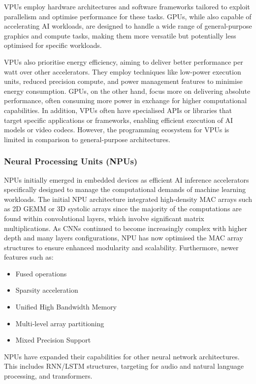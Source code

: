 VPUs employ hardware architectures and software frameworks tailored to exploit parallelism and optimise performance for these tasks. GPUs, while also capable of accelerating AI workloads, are designed to handle a wide range of general-purpose graphics and compute tasks, making them more versatile but potentially less optimised for specific workloads.

VPUs also prioritise energy efficiency, aiming to deliver better performance per watt over other accelerators. They employ techniques like low-power execution units, reduced precision compute, and power management features to minimise energy consumption. GPUs, on the other hand, focus more on delivering absolute performance, often consuming more power in exchange for higher computational capabilities. In addition, VPUs often have specialised APIs or libraries that target specific applications or frameworks, enabling efficient execution of AI models or video codecs. However, the programming ecosystem for VPUs is limited in comparison to general-purpose architectures.

\subsubsection{Neural Processing Units (NPUs)}
 NPUs initially emerged in embedded devices as efficient AI inference accelerators specifically designed to manage the computational demands of machine learning workloads. The initial NPU architecture integrated high-density MAC arrays such as 2D GEMM or 3D systolic arrays since the majority of the computations are found within convolutional layers, which involve significant matrix multiplications. As CNNs continued to become increasingly complex with higher depth and many layers configurations, NPU has now optimised the MAC array structures to ensure enhanced modularity and scalability. Furthermore, newer features such as:

\begin{itemize}
    \item Fused operations
    \item Sparsity acceleration
    \item Unified High Bandwidth Memory
    \item Multi-level array partitioning
    \item Mixed Precision Support
\end{itemize}

NPUs have expanded their capabilities for other neural network architectures. This includes RNN/LSTM structures, targeting for audio and natural language processing, and transformers.


